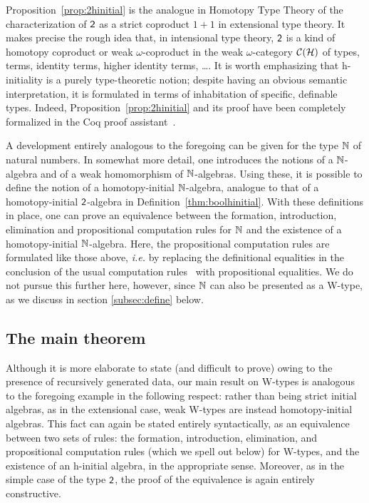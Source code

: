 Proposition~\ref{prop:2hinitial} is the analogue in Homotopy Type Theory of the characterization of 
$\mathsf{2}$ as a strict coproduct $1+1$ in extensional type theory. It makes precise the rough idea that, 
in intensional type theory, $\mathsf{2}$ is a kind of homotopy coproduct or weak $\omega$-coproduct 
in the weak $\omega$-category $\mathcal{C}(\mathcal{H})$ of types, terms, identity terms, higher identity terms, \ldots.  
It is worth emphasizing that h-initiality is a purely type-theoretic notion; despite having an obvious semantic interpretation, it is formulated in terms of inhabitation of specific, definable types.  Indeed, Proposition~\ref{prop:2hinitial} and its proof have been completely formalized in the Coq proof assistant~\cite{AwodeyS:indtht}.  

\begin{remark} A development entirely analogous to the foregoing can be given for the type
$\mathbb{N}$ of natural numbers. In somewhat more detail, one introduces the notions of a $\mathbb{N}$-algebra and 
of a weak homomorphism of $\mathbb{N}$-algebras. Using these, it is possible to define the notion of
a homotopy-initial $\mathbb{N}$-algebra, analogue to that of a homotopy-initial
$\mathsf{2}$-algebra in Definition~\ref{thm:boolhinitial}. With these definitions in place, one can prove an equivalence between the formation, introduction, elimination and propositional computation rules for $\mathbb{N}$ and the existence of a homotopy-initial $\mathbb{N}$-algebra. 
Here, the propositional computation rules are formulated like those above, \emph{i.e.} by replacing the definitional equalities in the conclusion of the usual computation rules~\cite[Section~5.3]{NordstromB:marltt} with propositional equalities. 
 We do not pursue this further here, however, since $\mathbb{N}$ can also be presented as a W-type, as we discuss in section \ref{subsec:define} below.
\end{remark}

\subsection{The main theorem}\label{subsection:main}

\noindent Although it is more elaborate to state (and difficult to prove) owing to the presence of 
recursively generated data, our main result on  W-types is analogous to 
the foregoing example in the following respect: rather than being strict initial algebras, as in the 
extensional case, weak W-types are instead homotopy-initial algebras.  This fact can again be stated 
entirely syntactically, as an equivalence between two sets of rules:  the 
formation, introduction, elimination, and propositional computation rules (which we spell
out below) for W-types, and the existence of an h-initial algebra, in the appropriate sense.  Moreover, as in the simple case of the type $\mathsf{2}$, the proof of the equivalence is again entirely constructive. 

